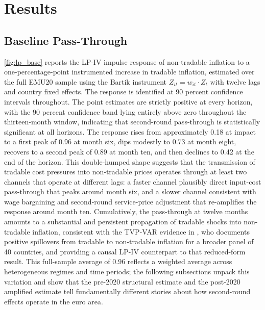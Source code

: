 \documentclass[a4paper,12pt]{article}
\begin{document}

\section{Results}\label{sec:results}

\subsection{Baseline Pass-Through}

\autoref{fig:lp_base} reports the LP-IV impulse response of non-tradable inflation to a one-percentage-point instrumented increase in tradable inflation, estimated over the full EMU20 sample using the Bartik instrument $Z_{it} = w_{it}\cdot Z_t$ with twelve lags and country fixed effects. The response is identified at 90 percent confidence intervals throughout. The point estimates are strictly positive at every horizon, with the 90 percent confidence band lying entirely above zero throughout the thirteen-month window, indicating that second-round pass-through is statistically significant at all horizons. The response rises from approximately 0.18 at impact to a first peak of 0.96 at month six, dips modestly to 0.73 at month eight, recovers to a second peak of 0.89 at month ten, and then declines to 0.42 at the end of the horizon. This double-humped shape suggests that the transmission of tradable cost pressures into non-tradable prices operates through at least two channels that operate at different lags: a faster channel plausibly direct input-cost pass-through that peaks around month six, and a slower channel consistent with wage bargaining and second-round service-price adjustment that re-amplifies the response around month ten. Cumulatively, the pass-through at twelve months amounts to a substantial and persistent propagation of tradable shocks into non-tradable inflation, consistent with the TVP-VAR evidence in , who documents positive spillovers from tradable to non-tradable inflation for a broader panel of 40 countries, and providing a causal LP-IV counterpart to that reduced-form result. This full-sample average of 0.96 reflects a weighted average across heterogeneous regimes and time periods; the following subsections unpack this variation and show that the pre-2020 structural estimate and the post-2020 amplified estimate tell fundamentally different stories about how second-round effects operate in the euro area.
\end{document}
